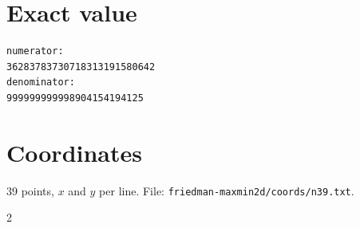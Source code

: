 \documentclass[11pt,a4paper]{article}
\begin{document}
\appendix
\section{Exact value}
{\small
\begin{verbatim}
numerator:
36283783730718313191580642
denominator:
999999999998904154194125
\end{verbatim}}

\section{Coordinates}
39 points, $x$ and $y$ per line. File: \texttt{friedman-maxmin2d/coords/n39.txt}.
{\tiny
\begin{multicols}{2}
\end{multicols}}
\end{document}

